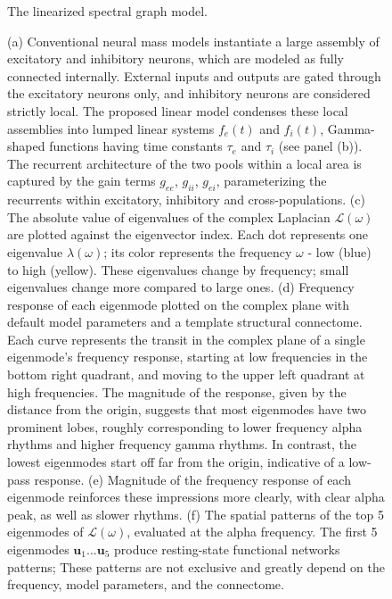 \begin{figure}[htbp]
	\caption{The linearized  spectral graph model.}
    \caption*{(a) Conventional neural mass models instantiate a large assembly of excitatory and inhibitory neurons, which are modeled as fully connected internally. External inputs and outputs are gated through the excitatory neurons only, and inhibitory neurons are considered strictly local. The proposed linear model condenses these local assemblies into lumped linear systems $f_{e}(t)$ and $f_{i}(t)$, Gamma-shaped functions having time constants $\tau_e$ and $\tau_i$ (see panel (b)). The recurrent architecture of the two pools within a local area is captured by the gain terms $g_{ee}$, $g_{ii}$, $g_{ei}$, parameterizing the recurrents within excitatory, inhibitory and cross-populations. (c) The absolute value of eigenvalues of the complex Laplacian $\bm{\mathcal{L}}(\omega)$ are plotted against the eigenvector index. Each dot represents one eigenvalue  $\lambda(\omega)$; its color represents the frequency $\omega$ - low (blue) to high (yellow). These eigenvalues change by frequency; small eigenvalues change more compared to large ones. (d) Frequency response of each eigenmode plotted on the complex plane with default model parameters and a template structural connectome. Each curve represents the transit in the complex plane of a single eigenmode's frequency response, starting at low frequencies in the bottom right quadrant, and moving to the upper left quadrant at high frequencies. The magnitude of the response, given by the distance from the origin, suggests that most eigenmodes have two prominent lobes, roughly corresponding to lower frequency alpha rhythms and higher frequency gamma rhythms. In contrast, the lowest eigenmodes start off far from the origin, indicative of a low-pass response. (e) Magnitude of the frequency response of each eigenmode reinforces these impressions more clearly, with clear alpha peak, as well as slower rhythms. (f) The spatial patterns of the top 5 eigenmodes of $\bm{\mathcal{L}}(\omega)$, evaluated at the alpha frequency. The first 5 eigenmodes $\bm{u}_1 ... \bm{u}_5$ produce resting-state functional networks patterns; These patterns are not exclusive and greatly depend on the frequency,  model parameters, and the connectome.}
    \label{fig:sgmodel}
\end{figure}
\clearpage
